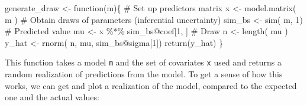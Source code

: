 \documentclass[
  letterpaper,
  DIV=11,
  numbers=noendperiod,
  oneside]{scrreprt}
\newenvironment{Shaded}{\begin{snugshade}}{\end{snugshade}}
\newcommand{\CommentTok}[1]{\textcolor[rgb]{0.37,0.37,0.37}{#1}}
\newcommand{\ControlFlowTok}[1]{\textcolor[rgb]{0.00,0.23,0.31}{#1}}
\newcommand{\DecValTok}[1]{\textcolor[rgb]{0.68,0.00,0.00}{#1}}
\newcommand{\FunctionTok}[1]{\textcolor[rgb]{0.28,0.35,0.67}{#1}}
\newcommand{\NormalTok}[1]{\textcolor[rgb]{0.00,0.23,0.31}{#1}}
\newcommand{\OtherTok}[1]{\textcolor[rgb]{0.00,0.23,0.31}{#1}}
\newcommand{\SpecialCharTok}[1]{\textcolor[rgb]{0.37,0.37,0.37}{#1}}
\begin{document}
\begin{Shaded}
\begin{Highlighting}[]
\NormalTok{generate\_draw }\OtherTok{\textless{}{-}} \ControlFlowTok{function}\NormalTok{(m)\{}
  \CommentTok{\# Set up predictors matrix}
\NormalTok{  x }\OtherTok{\textless{}{-}} \FunctionTok{model.matrix}\NormalTok{( m )}
  \CommentTok{\# Obtain draws of parameters (inferential uncertainty)}
\NormalTok{  sim\_bs }\OtherTok{\textless{}{-}} \FunctionTok{sim}\NormalTok{( m, }\DecValTok{1}\NormalTok{)}
  \CommentTok{\# Predicted value}
\NormalTok{  mu }\OtherTok{\textless{}{-}}\NormalTok{ x }\SpecialCharTok{\%*\%}\NormalTok{ sim\_bs}\SpecialCharTok{@}\NormalTok{coef[}\DecValTok{1}\NormalTok{, ]}
  \CommentTok{\# Draw}
\NormalTok{  n }\OtherTok{\textless{}{-}} \FunctionTok{length}\NormalTok{( mu )}
\NormalTok{  y\_hat }\OtherTok{\textless{}{-}} \FunctionTok{rnorm}\NormalTok{( n, mu, sim\_bs}\SpecialCharTok{@}\NormalTok{sigma[}\DecValTok{1}\NormalTok{])}
  \FunctionTok{return}\NormalTok{(y\_hat)}
\NormalTok{\}}
\end{Highlighting}
\end{Shaded}

This function takes a model \texttt{m} and the set of covariates
\texttt{x} used and returns a random realization of predictions from the
model. To get a sense of how this works, we can get and plot a
realization of the model, compared to the expected one and the actual
values:
\end{document}
